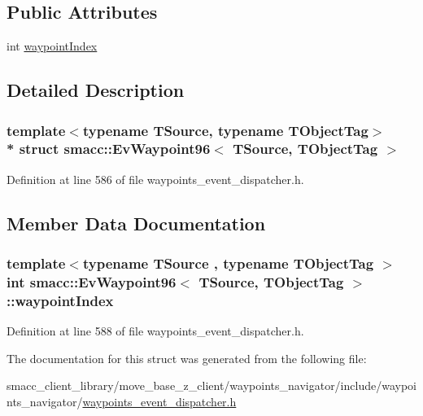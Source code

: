 \subsection*{Public Attributes}
\begin{DoxyCompactItemize}
\item 
int \hyperlink{structsmacc_1_1EvWaypoint96_ade1c69b49023c6a6e4f260da2043c4a8}{waypoint\+Index}
\end{DoxyCompactItemize}


\subsection{Detailed Description}
\subsubsection*{template$<$typename T\+Source, typename T\+Object\+Tag$>$\\*
struct smacc\+::\+Ev\+Waypoint96$<$ T\+Source, T\+Object\+Tag $>$}



Definition at line 586 of file waypoints\+\_\+event\+\_\+dispatcher.\+h.



\subsection{Member Data Documentation}
\subsubsection[{\texorpdfstring{waypoint\+Index}{waypointIndex}}]{\setlength{\rightskip}{0pt plus 5cm}template$<$typename T\+Source , typename T\+Object\+Tag $>$ int {\bf smacc\+::\+Ev\+Waypoint96}$<$ T\+Source, T\+Object\+Tag $>$\+::waypoint\+Index}\hypertarget{structsmacc_1_1EvWaypoint96_ade1c69b49023c6a6e4f260da2043c4a8}{}\label{structsmacc_1_1EvWaypoint96_ade1c69b49023c6a6e4f260da2043c4a8}


Definition at line 588 of file waypoints\+\_\+event\+\_\+dispatcher.\+h.



The documentation for this struct was generated from the following file\+:\begin{DoxyCompactItemize}
\item 
smacc\+\_\+client\+\_\+library/move\+\_\+base\+\_\+z\+\_\+client/waypoints\+\_\+navigator/include/waypoints\+\_\+navigator/\hyperlink{waypoints__event__dispatcher_8h}{waypoints\+\_\+event\+\_\+dispatcher.\+h}\end{DoxyCompactItemize}
